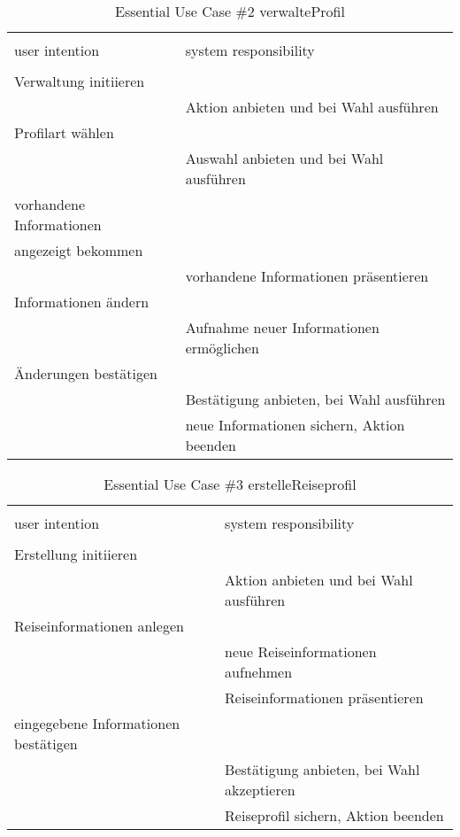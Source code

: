 \begin{table}[H]
\caption{Essential Use Case \#2 verwalteProfil }
\centering
\begin{tabular}{l l}
\\ [-0.5ex]

\hline\hline
\\ [-0.5ex]
user intention & system responsibility
\\ [1.5ex]
\hline
\\ [-0.5ex]
Verwaltung initiieren		& 											 \\[1ex]
							& Aktion anbieten und bei Wahl ausführen     \\[1ex]
Profilart wählen			& 											 \\[1ex]
							& Auswahl anbieten und bei Wahl ausführen	 \\[1ex]					
vorhandene Informationen	& 											 \\[1ex]
angezeigt bekommen			& 											 \\[1ex]
							& vorhandene Informationen präsentieren      \\[1ex] 
Informationen ändern 		& 											 \\[1ex] 
							& Aufnahme neuer Informationen ermöglichen	 \\[1ex]
Änderungen bestätigen		& 											 \\[1ex]
							& Bestätigung anbieten, bei Wahl ausführen   \\[1ex]
							& neue Informationen sichern, Aktion beenden \\[1ex]

\hline
\end{tabular}
\label{tab:profilbearbeiten}
\end{table}


\begin{table}[H]
\caption{Essential Use Case \#3 erstelleReiseprofil }
\centering
\begin{tabular}{l l}
\\ [-0.5ex]

\hline\hline
\\ [-0.5ex]
user intention & system responsibility
\\ [1.5ex]
\hline
\\ [-0.5ex]
Erstellung initiieren 		& 											 \\[1ex]
							& Aktion anbieten und bei Wahl ausführen	 \\[1ex]
Reiseinformationen anlegen 	& 											 \\[1ex] 
							& neue Reiseinformationen aufnehmen				 \\[1ex]
							& Reiseinformationen präsentieren				 \\[1ex]
eingegebene Informationen bestätigen	& 											 \\[1ex]
							& Bestätigung anbieten, bei Wahl akzeptieren \\[1ex]
							& Reiseprofil sichern, Aktion beenden 		 \\[1ex]

\hline
\end{tabular}
\label{tab:mietauftrag}
\end{table}

